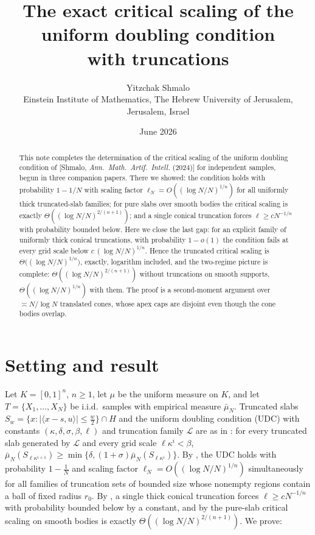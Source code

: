 \documentclass[11pt]{article}
\title{The exact critical scaling of the uniform doubling condition\\
with truncations}
\author{Yitzchak Shmalo\\
\small Einstein Institute of Mathematics, The Hebrew University of Jerusalem, Jerusalem, Israel\\
\small }
\date{June 2026}
\newcommand{\emp}{\bar\mu_N}
\begin{document}
\maketitle

\begin{abstract}
This note completes the determination of the critical scaling of the uniform
doubling condition of [Shmalo, \emph{Ann.\ Math.\ Artif.\ Intell.} (2024)] for
independent samples, begun in three companion papers.  There we showed: the
condition holds with probability $1-1/N$ with scaling factor
$\ell_N=O((\log N/N)^{1/n})$ for all uniformly thick truncated-slab families;
for pure slabs over smooth bodies the critical scaling is exactly
$\Theta((\log N/N)^{2/(n+1)})$; and a single conical truncation forces
$\ell\ge cN^{-1/n}$ with probability bounded below.  Here we close the last
gap: for an explicit family of uniformly thick conical truncations, with
probability $1-o(1)$ the condition fails at every grid scale below
$c\,(\log N/N)^{1/n}$.  Hence the truncated critical scaling is
$\Theta\bigl((\log N/N)^{1/n}\bigr)$, exactly, logarithm included, and the
two-regime picture is complete: $\Theta((\log N/N)^{2/(n+1)})$ without
truncations on smooth supports, $\Theta((\log N/N)^{1/n})$ with them.  The
proof is a second-moment argument over $\asymp N/\log N$ translated cones,
whose apex caps are disjoint even though the cone bodies overlap.
\end{abstract}

\section{Setting and result}\label{sec:intro}

Let $K=[0,1]^n$, $n\ge1$, let $\mu$ be the uniform measure on $K$, and let
$T=\{X_1,\dots,X_N\}$ be i.i.d.\ samples with empirical measure $\emp$.
Truncated slabs $S_w=\{x:|\langle x-s,u\rangle|\le\frac w2\}\cap H$ and the
uniform doubling condition (UDC) with constants
$(\kappa,\delta,\sigma,\beta,\ell)$ and truncation family $\mathcal L$ are as
in \cite{ShmaloUDC,companion2}: for every truncated slab generated by
$\mathcal L$ and every grid scale $\ell\kappa^i<\beta$,
$\emp(S_{\ell\kappa^{i+1}})\ge\min\{\delta,(1+\sigma)\emp(S_{\ell\kappa^i})\}$.
By \cite{companion2}, the UDC holds with probability $1-\frac1N$ and scaling
factor $\ell_N=O((\log N/N)^{1/n})$ simultaneously for all families of
truncation sets of bounded size whose nonempty regions contain a ball of fixed
radius $r_0$.  By \cite{companion3}, a single thick conical
truncation forces $\ell\ge cN^{-1/n}$ with probability bounded below by a
constant, and by \cite{companion4} the pure-slab critical scaling on smooth
bodies is exactly $\Theta((\log N/N)^{2/(n+1)})$.  We prove:
\end{document}
